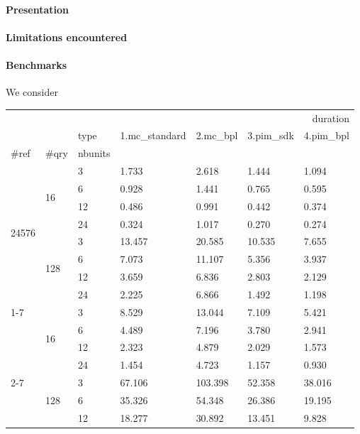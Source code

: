 \documentclass[12pt, a4paper]{report}
\begin{document}

\paragraph{Presentation}

\paragraph{Limitations encountered} 

\paragraph{Benchmarks} We consider 

\begin{tabular}{lllllll}
\toprule
 &  &  & \multicolumn{4}{r}{duration} \\
 &  & type & 1.mc_standard & 2.mc_bpl & 3.pim_sdk & 4.pim_bpl \\
#ref & #qry & nbunits &  &  &  &  \\
\midrule
\multirow[t]{8}{*}{24576} & \multirow[t]{4}{*}{16} & 3 & 1.733 & 2.618 & 1.444 & 1.094 \\
 &  & 6 & 0.928 & 1.441 & 0.765 & 0.595 \\
 &  & 12 & 0.486 & 0.991 & 0.442 & 0.374 \\
 &  & 24 & 0.324 & 1.017 & 0.270 & 0.274 \\
\cline{2-7}
 & \multirow[t]{4}{*}{128} & 3 & 13.457 & 20.585 & 10.535 & 7.655 \\
 &  & 6 & 7.073 & 11.107 & 5.356 & 3.937 \\
 &  & 12 & 3.659 & 6.836 & 2.803 & 2.129 \\
 &  & 24 & 2.225 & 6.866 & 1.492 & 1.198 \\
\cline{1-7} \cline{2-7}
\multirow[t]{8}{*}{122880} & \multirow[t]{4}{*}{16} & 3 & 8.529 & 13.044 & 7.109 & 5.421 \\
 &  & 6 & 4.489 & 7.196 & 3.780 & 2.941 \\
 &  & 12 & 2.323 & 4.879 & 2.029 & 1.573 \\
 &  & 24 & 1.454 & 4.723 & 1.157 & 0.930 \\
\cline{2-7}
 & \multirow[t]{4}{*}{128} & 3 & 67.106 & 103.398 & 52.358 & 38.016 \\
 &  & 6 & 35.326 & 54.348 & 26.386 & 19.195 \\
 &  & 12 & 18.277 & 30.892 & 13.451 & 9.828 \\

\end{tabular}
\end{document}
